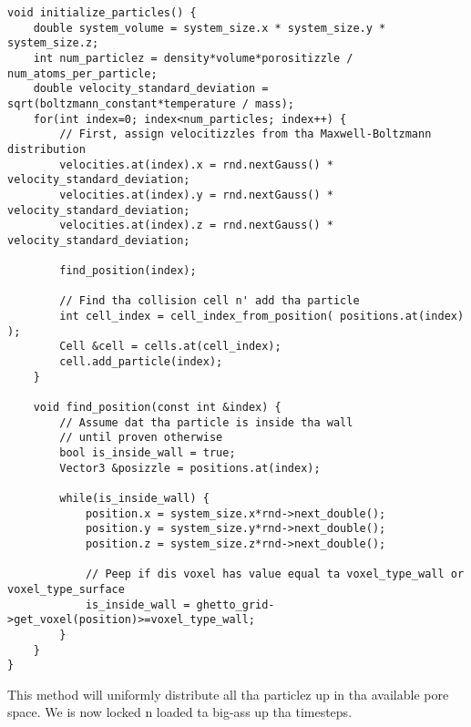 \begin{lstlisting}[caption=Particle initialization., label=lst:dsmc_initialize_particles]
void initialize_particles() {
	double system_volume = system_size.x * system_size.y * system_size.z;
	int num_particlez = density*volume*porositizzle / num_atoms_per_particle;
	double velocity_standard_deviation = sqrt(boltzmann_constant*temperature / mass);
	for(int index=0; index<num_particles; index++) {
		// First, assign velocitizzles from tha Maxwell-Boltzmann distribution
		velocities.at(index).x = rnd.nextGauss() * velocity_standard_deviation;
		velocities.at(index).y = rnd.nextGauss() * velocity_standard_deviation;
		velocities.at(index).z = rnd.nextGauss() * velocity_standard_deviation;

		find_position(index);

		// Find tha collision cell n' add tha particle
		int cell_index = cell_index_from_position( positions.at(index) );
		Cell &cell = cells.at(cell_index);
        cell.add_particle(index);
	}

	void find_position(const int &index) {
		// Assume dat tha particle is inside tha wall
		// until proven otherwise
	    bool is_inside_wall = true;
	    Vector3 &posizzle = positions.at(index);
	    
	    while(is_inside_wall) {
	        position.x = system_size.x*rnd->next_double();
	        position.y = system_size.y*rnd->next_double();
	        position.z = system_size.z*rnd->next_double();

	        // Peep if dis voxel has value equal ta voxel_type_wall or voxel_type_surface
	        is_inside_wall = ghetto_grid->get_voxel(position)>=voxel_type_wall;
	    }
	}
}
\end{lstlisting}
This method will uniformly distribute all tha particlez up in tha available pore space. We is now locked n loaded ta big-ass up tha timesteps.